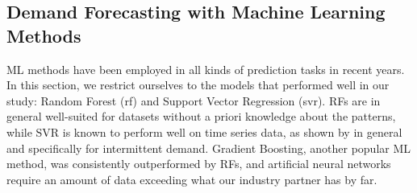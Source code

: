 \subsection{Demand Forecasting with Machine Learning Methods}
\label{ml_methods}

ML methods have been employed in all kinds of prediction tasks in recent
    years.
In this section, we restrict ourselves to the models that performed well in
    our study: Random Forest (\gls{rf}) and Support Vector Regression
    (\gls{svr}).
RFs are in general well-suited for datasets without a priori knowledge about
    the patterns, while SVR is known to perform well on time series data, as
    shown by \cite{hansen2006} in general and \cite{bao2004} specifically for
    intermittent demand.
Gradient Boosting, another popular ML method, was consistently outperformed by
    RFs, and artificial neural networks require an amount of data
    exceeding what our industry partner has by far.
